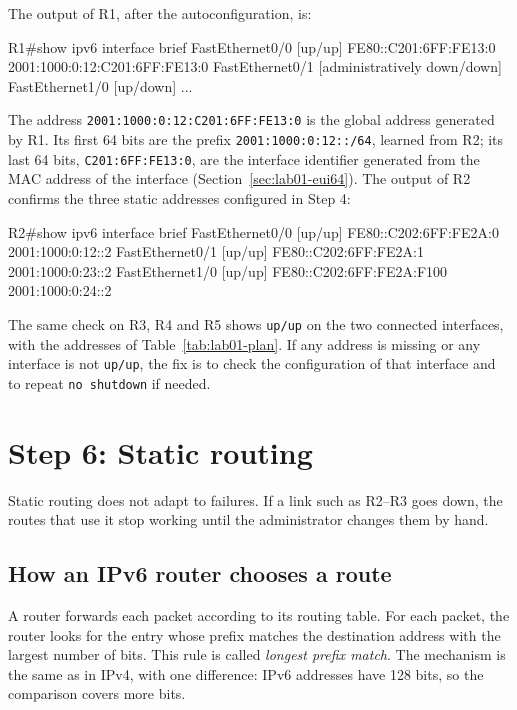 The output of R1, after the autoconfiguration, is:

\begin{codeblock}
R1#show ipv6 interface brief
FastEthernet0/0          [up/up]
    FE80::C201:6FF:FE13:0
    2001:1000:0:12:C201:6FF:FE13:0
FastEthernet0/1          [administratively down/down]
FastEthernet1/0          [up/down]
...
\end{codeblock}

The address \texttt{2001:1000:0:12:C201:6FF:FE13:0} is the global address generated by R1. Its first 64 bits are the prefix \texttt{2001:1000:0:12::/64}, learned from R2; its last 64 bits, \texttt{C201:6FF:FE13:0}, are the interface identifier generated from the MAC address of the interface (Section~\ref{sec:lab01-eui64}). The output of R2 confirms the three static addresses configured in Step 4:

\begin{codeblock}
R2#show ipv6 interface brief
FastEthernet0/0          [up/up]
    FE80::C202:6FF:FE2A:0
    2001:1000:0:12::2
FastEthernet0/1          [up/up]
    FE80::C202:6FF:FE2A:1
    2001:1000:0:23::2
FastEthernet1/0          [up/up]
    FE80::C202:6FF:FE2A:F100
    2001:1000:0:24::2
\end{codeblock}

The same check on R3, R4 and R5 shows \texttt{up/up} on the two connected interfaces, with the addresses of Table~\ref{tab:lab01-plan}. If any address is missing or any interface is not \texttt{up/up}, the fix is to check the configuration of that interface and to repeat \texttt{no shutdown} if needed.

\section{Step 6: Static routing}

Static routing does not adapt to failures. If a link such as R2--R3 goes down, the routes that use it stop working until the administrator changes them by hand.

\subsection{How an IPv6 router chooses a route}

A router forwards each packet according to its routing table. For each packet, the router looks for the entry whose prefix matches the destination address with the largest number of bits. This rule is called \emph{longest prefix match}. The mechanism is the same as in IPv4, with one difference: IPv6 addresses have 128 bits, so the comparison covers more bits.


